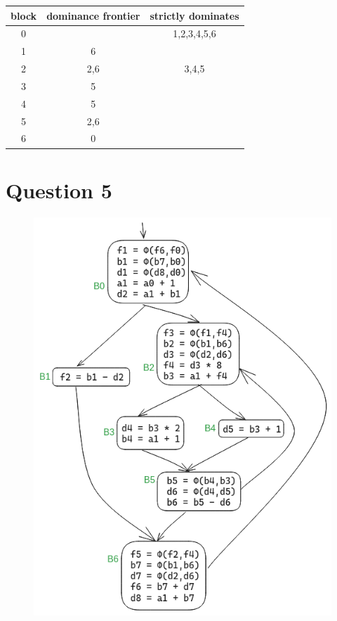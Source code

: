 \documentclass{article}
\begin{document}
    \begin{center}
        \begin{tabular}{ c c c }
            \hline
            block   & dominance frontier        & strictly dominates \\
            \hline
            0       &                           & 1,2,3,4,5,6       \\
            1       & 6                         &       \\
            2       & 2,6                       & 3,4,5     \\
            3       & 5                         &      \\
            4       & 5                         &      \\
            5       & 2,6                       &      \\
            6       & 0                         &      \\
            \hline
        \end{tabular}
    \end{center}

    \section*{Question 5}

    \begin{figure}[H]
        \includegraphics[width=1\textwidth]{hw4-ssa5.png}
    \end{figure}
\end{document}
